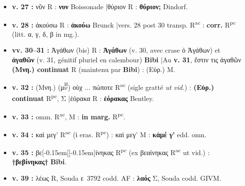 \documentclass[10pt, a4paper, twoside]{book}
\renewcommand{\_}{\origunderscore\penalty0\relax}
\providecommand{\italique}[1]{\emph{#1}}
\providecommand{\lecon}[1]{\textbf{#1}}
\providecommand{\expo}[1]{\textsuperscript{#1}}
\providecommand{\Rac}{R\expo{ac}}
\providecommand{\Rpc}{R\expo{pc}}
\providecommand{\Mon}{M}
\providecommand{\espApp}{\hspace{0.5em}|\hspace{0.5em}}
\providecommand{\inRas}[2]{[\kern-0.15em[\text{#1}]\kern-0.15em]\text{#2}}
\providecommand{\auDessus}[2]{\ensuremath{\overset{\text{#2}}{\text{#1}}}}
\begin{document}
\begin{itemize}
\begin{itemize}
    \item \textbf{v. 27 :} νῦν R : \lecon{νυν} Boissonade \espApp θύριον R : \lecon{θύριον;} Dindorf.
    \item \textbf{v. 28 :} ἀκούσω R : \lecon{ἀκούω} Brunck \espApp vers. 28 post 30 transp. \Rac{} : \lecon{corr.} \Rpc{} (litt. α, γ, δ, β in mg.).
    \item \textbf{vv. 30–31 :} Ἀγάθων (bis) R : \lecon{Ἁγάθων} (v. 30, avec crase ὁ Ἀγάθων) et \lecon{ἀγαθῶν} (v. 31, génitif pluriel en calembour) \lecon{Bibi} \espApp Au \textbf{v. 31}, ἔστιν τις ἀγαθῶν \lecon{(Μνη.) continuat} R (maintenu par \textbf{Bibi}) : (Εὐρ.) \Mon{}.
    \item \textbf{v. 32 :} (Μνη.) (μ\auDessus{ν}{Η}) οὐχ ... πώποτε \Rac{} (sigle gratté \italique{ut vid.}) : \lecon{(Εὐρ.) continuat} \Rpc{}, Σ \espApp ἑόρακα R : \lecon{ἑόρακας} Bentley.
    \item \textbf{v. 33 :} omm. \Rac{}, \Mon{} : \lecon{in marg.} \Rpc{}.
    \item \textbf{v. 34 :} καὶ μεγ' \Rac{} (ὶ eras. \Rpc{}) : καὶ μεγ' \Mon{} : \lecon{κἀμέ γ'} edd. omn.
    \item \textbf{v. 35 :} βε\inRas{α}{β}ίνηκας \Rpc{} (ex βεαίνηκας \Rac{} ut vid.) : \lecon{†βεβίνηκας†} \lecon{Bibi}.
    \item \textbf{v. 39 :} λέως R, Souda ε~3792 codd. AF : \lecon{λαός} Σ, Souda codd. GIVM.
  \end{itemize}
\end{itemize}
\end{document}
